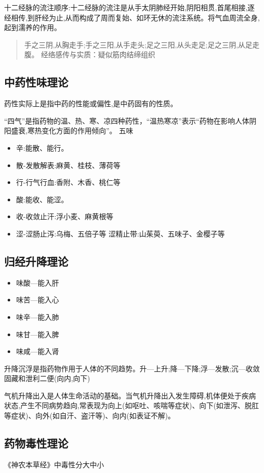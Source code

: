 \documentclass[
  letterpaper,
  DIV=11,
  numbers=noendperiod]{scrreprt}
\providecommand{\tightlist}{%
  \setlength{\itemsep}{0pt}\setlength{\parskip}{0pt}}\usepackage{longtable,booktabs,array}
\begin{document}
十二经脉的流注顺序:十二经脉的流注是从手太阴肺经开始,阴阳相贯,首尾相接,逐经相传,到肝经为止,从而构成了周而复始、如环无休的流注系统。将气血周流全身,起到濡养的作用。

\begin{quote}
手之三阴,从胸走手;手之三阳,从手走头;足之三阳,从头走足;足之三阴,从足走腹。
经络感传与实质：疑似筋肉结缔组织
\end{quote}

\subsection{中药性味理论}\label{ux4e2dux836fux6027ux5473ux7406ux8bba}

药性实际上是指中药的性能或偏性,是中药固有的性质。

``四气''是指药物的温、热、寒、凉四种药性，``温热寒凉''表示``药物在影响人体阴阳盛衰,寒热变化方面的作用倾向''。
五味

\begin{itemize}
\tightlist
\item
  辛:能散、能行。
\item
  散-发散解表:麻黄、桂枝、薄荷等
\item
  行-行气行血:香附、木香、桃仁等
\item
  酸:能收、能涩。
\item
  收-收敛止汗:浮小麦、麻黄根等
\item
  涩-涩肠止泻:乌梅、五倍子等 涩精止带:山茱萸、五味子、金樱子等
\end{itemize}

\subsection{归经升降理论}\label{ux5f52ux7ecfux5347ux964dux7406ux8bba}

\begin{itemize}
\tightlist
\item
  味酸---能入肝
\item
  味苦---能入心
\item
  味辛---能入肺
\item
  味甘---能入脾
\item
  味咸---能入肾
\end{itemize}

升降沉浮是指药物作用于人体的不同趋势。升---上升;降---下降;浮---发散;沉---收敛固藏和泄利二便(向内,向下)

气机升降出入是人体生命活动的基础。当气机升降出入发生障碍,机体便处于疾病状态,产生不同病势趋向,常表现为向上(如呕吐、咳喘等症状)、向下(如泄泻、脱肛等症状)、向外(如自汗、盗汗等)、向内(如表证不解)。

\subsection{药物毒性理论}\label{ux836fux7269ux6bd2ux6027ux7406ux8bba}

《神农本草经》中毒性分大中小
\end{document}
